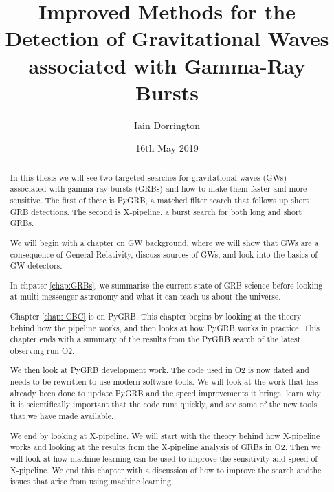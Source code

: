 \documentclass[11pt]{cuthesis}
\title{Improved Methods for the Detection of Gravitational Waves associated with Gamma-Ray Bursts}
\author{Iain Dorrington}
\date{16th May 2019}
\newcommand{\xp}{X-pipeline }
\newcommand{\xpc}{X-pipeline, }
\newcommand{\xpfs}{X-pipeline. }
\begin{document}

\maketitle

\frontmatter

\begin{abstract}

In this thesis we will see two targeted searches for gravitational waves (GWs) associated with gamma-ray bursts (GRBs) and how to make them faster and more sensitive. The first of these is PyGRB, a matched filter search that follows up short GRB detections. The second is  \xpc a burst search for both long and short GRBs.                                  

We will begin with a chapter on GW background, where we will show that GWs are a consequence of General Relativity, discuss  sources of GWs, and look into the basics of GW detectors.

In chpater \ref{chap:GRBs}, we summarise the current state of GRB science before looking at multi-messenger astronomy and what it can teach us about the universe.

Chapter \ref{chap: CBC} is on PyGRB. This chapter begins by looking at the theory behind how the pipeline works, and then looks at how PyGRB works in practice. This chapter ends with a summary of the results from the PyGRB search of the latest observing run O2.

We then look at PyGRB development work. The code used in O2 is now dated and needs to be rewritten to use modern software tools. We will look at the work that has already been done to update PyGRB and the speed improvements it brings, learn why it is scientifically important that the code runs quickly, and see some of the new tools that we have made available.

We end by looking at \xpfs We will start with the theory behind how \xp works and looking at the results from the \xp analysis of GRBs in O2. Then we will look at how machine learning can be used to improve the sensitivity and speed of \xpfs We end this chapter with a discussion of how to improve the search andthe issues that arise from using machine learning. 
\end{abstract}

\declaration

\tableofcontents
\listoffigures
\listoftables
\end{document}
